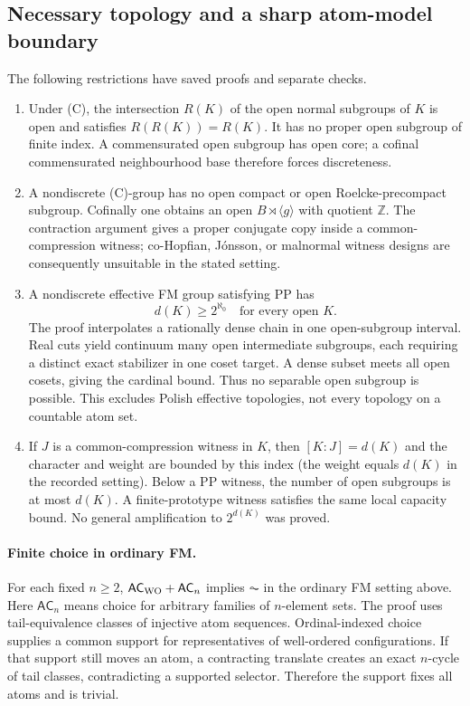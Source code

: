\subsection{Necessary topology and a sharp atom-model boundary}
The following restrictions have saved proofs and separate checks.
\begin{enumerate}
\item Under (C), the intersection $R(K)$ of the open normal subgroups of $K$ is open and satisfies $R(R(K))=R(K)$. It has no proper open subgroup of finite index. A commensurated open subgroup has open core; a cofinal commensurated neighbourhood base therefore forces discreteness.
\item A nondiscrete (C)-group has no open compact or open Roelcke-precompact subgroup. Cofinally one obtains an open $B\rtimes\langle g\rangle$ with quotient $\mathbb Z$. The contraction argument gives a proper conjugate copy inside a common-compression witness; co-Hopfian, J\'onsson, or malnormal witness designs are consequently unsuitable in the stated setting.
\item A nondiscrete effective FM group satisfying PP has
\[
 d(K)\geq 2^{\aleph_0}\quad\text{for every open }K.
\]
The proof interpolates a rationally dense chain in one open-subgroup interval. Real cuts yield continuum many open intermediate subgroups, each requiring a distinct exact stabilizer in one coset target. A dense subset meets all open cosets, giving the cardinal bound. Thus no separable open subgroup is possible. This excludes Polish effective topologies, not every topology on a countable atom set.
\item If $J$ is a common-compression witness in $K$, then $[K:J]=d(K)$ and the character and weight are bounded by this index (the weight equals $d(K)$ in the recorded setting). Below a PP witness, the number of open subgroups is at most $d(K)$. A finite-prototype witness satisfies the same local capacity bound. No general amplification to $2^{d(K)}$ was proved.
\end{enumerate}

\paragraph{Finite choice in ordinary FM.}
For each fixed $n\geq2$, $\mathsf{AC}_{\mathrm{WO}}+\mathsf{AC}_n$ implies $\AC$ in the ordinary FM setting above. Here $\mathsf{AC}_n$ means choice for arbitrary families of $n$-element sets. The proof uses tail-equivalence classes of injective atom sequences. Ordinal-indexed choice supplies a common support for representatives of well-ordered configurations. If that support still moves an atom, a contracting translate creates an exact $n$-cycle of tail classes, contradicting a supported selector. Therefore the support fixes all atoms and is trivial.

